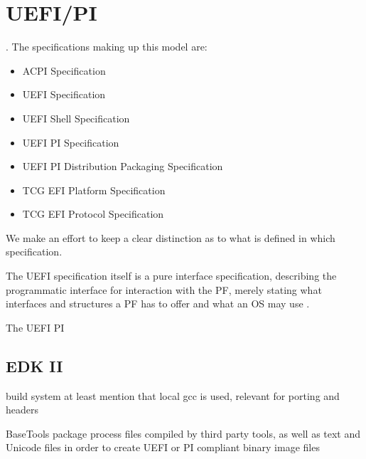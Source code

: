 
\chapter{\acs{UEFI}/\acs{PI}}

.
The specifications making up this model are:

\begin{itemize}
    \item \ac{ACPI} Specification
    \item \ac{UEFI} Specification
    \item \ac{UEFI} Shell Specification
    \item \ac{UEFI} \ac{PI} Specification
    \item \ac{UEFI} \ac{PI} Distribution Packaging Specification
    \item \ac{TCG} \ac{EFI} Platform Specification
    \item \ac{TCG} \ac{EFI} Protocol Specification
\end{itemize}

We make an effort to keep a clear distinction as to what is defined in which specification.

The \ac{UEFI} specification itself is a pure interface specification, describing the programmatic interface for interaction with the \ac{PF}, merely stating what interfaces and structures a \ac{PF} has to offer and what an \ac{OS} may use \cite{beyond-bios}.

The \ac{UEFI} \ac{PI}





\section{\acs{EDK} II}
build system
at least mention that local gcc is used, relevant for porting and headers

BaseTools package process files compiled by third party tools, as well as text and Unicode files in order to create UEFI or PI compliant binary image files
\cite{tianocore-edk2}